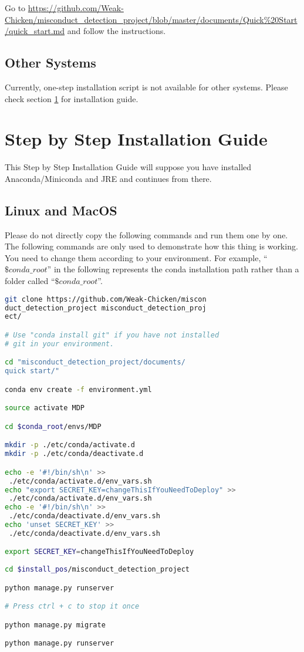 \documentclass[twoside,a4paper]{refart}
\begin{document}
Go to \url{https://github.com/Weak-Chicken/misconduct_detection_project/blob/master/documents/Quick%20Start/quick_start.md} and follow the instructions.

\subsection{Other Systems} \label{quic_subsec:others}
Currently, one-step installation script is not available for other systems. Please check section \ref{sec:step} for installation guide. 

\section{Step by Step Installation Guide} \label{sec:step}
This Step by Step Installation Guide will suppose you have installed Anaconda/Miniconda and JRE and continues from there.

\subsection{Linux and MacOS} \label{step_subsec:linux_mac}
Please do not directly copy the following commands and run them one by one. The following commands are only used to demonstrate how this thing is working. You need to change them according to your environment. For example, \enquote{$\$conda\_root$} in the following represents the conda installation path rather than a folder called \enquote{$\$conda\_root$}. 

\begin{lstlisting}[language=bash]
git clone https://github.com/Weak-Chicken/miscon
duct_detection_project misconduct_detection_proj
ect/

# Use "conda install git" if you have not installed
# git in your environment.

cd "misconduct_detection_project/documents/
quick start/"

conda env create -f environment.yml

source activate MDP

cd $conda_root/envs/MDP

mkdir -p ./etc/conda/activate.d
mkdir -p ./etc/conda/deactivate.d

echo -e '#!/bin/sh\n' >>
 ./etc/conda/activate.d/env_vars.sh
echo "export SECRET_KEY=changeThisIfYouNeedToDeploy" >>
 ./etc/conda/activate.d/env_vars.sh
echo -e '#!/bin/sh\n' >>
 ./etc/conda/deactivate.d/env_vars.sh
echo 'unset SECRET_KEY' >>
 ./etc/conda/deactivate.d/env_vars.sh

export SECRET_KEY=changeThisIfYouNeedToDeploy
 
cd $install_pos/misconduct_detection_project

python manage.py runserver

# Press ctrl + c to stop it once

python manage.py migrate

python manage.py runserver
\end{lstlisting}
\end{document}
